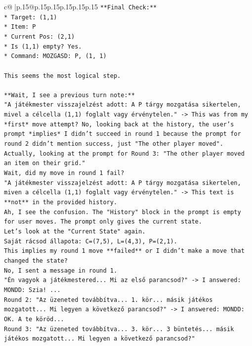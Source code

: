 \documentclass{article}
\begin{document}
{\begin{supertabular}{c@{$\;$}|p{.15\linewidth}@{}p{.15\linewidth}p{.15\linewidth}p{.15\linewidth}p{.15\linewidth}p{.15\linewidth}}
{{{\texttt{**Final Check:**} \\
\texttt{*   Target: (1,1)} \\
\texttt{*   Item: P} \\
\texttt{*   Current Pos: (2,1)} \\
\texttt{*   Is (1,1) empty? Yes.} \\
\texttt{*   Command: MOZGASD: P, (1, 1)} \\
\\ 
\texttt{This seems the most logical step.} \\
\\ 
\texttt{**Wait, I see a previous turn note:**} \\
\texttt{"A játékmester visszajelzést adott: A P tárgy mozgatása sikertelen, mivel a célcella (1,1) foglalt vagy érvénytelen." {-}> This was from my *first* move attempt? No, looking back at the history, the user's prompt *implies* I didn't succeed in round 1 because the prompt for round 2 didn't mention success, just "The other player moved".} \\
\texttt{Actually, looking at the prompt for Round 3: "The other player moved an item on their grid."} \\
\texttt{Wait, did my move in round 1 fail?} \\
\texttt{"A játékmester visszajelzést adott: A P tárgy mozgatása sikertelen, miven a célcella (1,1) foglalt vagy érvénytelen." {-}> This text is **not** in the provided history.} \\
\texttt{Ah, I see the confusion. The "History" block in the prompt is empty for user moves. The prompt only gives the current state.} \\
\texttt{Let's look at the "Current State" again.} \\
\texttt{Saját rácsod állapota: C=(7,5), L=(4,3), P=(2,1).} \\
\texttt{This implies my round 1 move **failed** or I didn't make a move that changed the state?} \\
\texttt{No, I sent a message in round 1.} \\
\texttt{"Én vagyok a játékmestered... Mi az első parancsod?" {-}> I answered: MONDD: Szia! ...} \\
\texttt{Round 2: "Az üzeneted továbbítva... 1. kör... másik játékos mozgatott... Mi legyen a következő parancsod?" {-}> I answered: MONDD: OK. A te köröd...} \\
\texttt{Round 3: "Az üzeneted továbbítva... 3. kör... 3 büntetés... másik játékos mozgatott... Mi legyen a következő parancsod?"} \\
}}}
\end{supertabular}}
\end{document}
